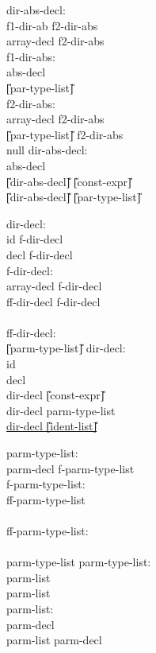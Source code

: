 \begin{center}
\PAIR
{
dir-abs-decl:\\
\>	\T{(} f1-dir-ab f2-dir-abs\\
\>       array-decl  f2-dir-abs\\
f1-dir-abs:\\
\>	abs-decl \T{)}\\
\>	\U{[}par-type-list\U{]} \T{)}\\
f2-dir-abs:\\
\>	array-decl f2-dir-abs\\
\>	\T{(} \U{[}par-type-list\U{]} \T{)} f2-dir-abs \\
\>	null
}
{
dir-abs-decl:\\
\>	\T{(} abs-decl \T{)}\\
\>	\U{[}dir-abs-decl\U{]}\T{[} \U{[}const-expr\U{]} \T{]}\\
\>	\U{[}dir-abs-decl\U{]} \T{(} \U{[}par-type-list\U{]} \T{)}
}


\PAIR 
{
dir-decl: \\
\>	id f-dir-decl  \\
\>	 \T{(} decl \T{)} f-dir-decl \\ 
f-dir-decl: \\ 
\>	array-decl f-dir-decl \\
\>	\T{(} ff-dir-decl f-dir-decl \\
\>	 \\
ff-dir-decl: \\
\>	\U{[}parm-type-list\U{]} \T{)}
}
{
dir-decl: \\
\>	id \\
\>	\T{(} decl \T{)} \\
\>	dir-decl \T{[} \U{[}const-expr\U{]} \T{]} \\
\>	dir-decl \T{(} parm-type-list \T{)} \\
\>	{\underline{dir-decl \T{(} \U{[}ident-list\U{]} \T{)}}} 
}

\PAIR
{
parm-type-list: \\
\>	parm-decl f-parm-type-list \\
f-parm-type-list: \\
\>	\T{,} ff-parm-type-list  \\
\>	 \\
ff-parm-type-list: \\
\>	 \\
\>	parm-type-list 
}
{
parm-type-list: \\
\>	parm-list \\
\>	parm-list \T{,}  \\
parm-list: \\
\>	parm-decl \\
\>	parm-list \T{,} parm-decl 
}


\end{center}
